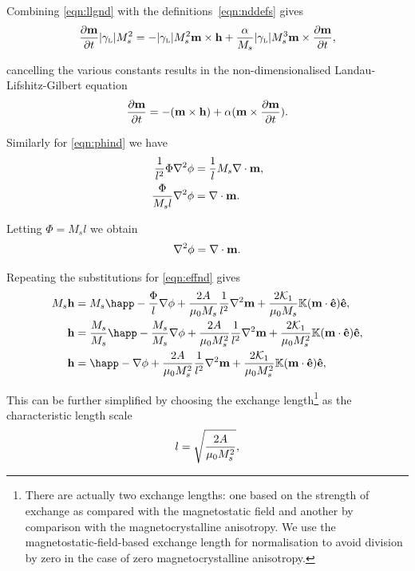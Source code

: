 Combining \cref{eqn:llgnd} with the definitions~\cref{eqn:nddefs} gives
\begin{equation}
   \frac{\partial \mathbf{m}}{\partial t} {\left|{\gamma_{\text{\tiny{L}}}} \right|} M_s^2 =
  - {\left|{\gamma_{\text{\tiny{L}}}} \right|} M_s^2 \mathbf{m} \times \mathbf{h} + \frac{\alpha}{M_s} {\left|{\gamma_{\text{\tiny{L}}}} \right|} M_s^3 \mathbf{m} \times \frac{\partial \mathbf{m}}{\partial t},
\end{equation}

cancelling the various constants results in the non-dimensionalised Landau-Lifshitz-Gilbert equation
\begin{equation}
  \label{eq:53}
  \frac{\partial \mathbf{m}}{\partial t} = - (\mathbf{m} \times \mathbf{h}) + \alpha (\mathbf{m} \times \frac{\partial \mathbf{m}}{\partial t}).
\end{equation}

Similarly for \cref{eqn:phind} we have
\begin{align*}
  \frac{1}{l^2} \Phi \nabla^{2} \phi &= \frac{1}{l} M_s \nabla \cdot \mathbf{m}, \\
  \frac{\Phi}{M_s l} \nabla^{2} \phi &= \nabla \cdot \mathbf{m}.
\end{align*}

Letting $\Phi = M_s l$ we obtain
\begin{equation}
  \label{eq:57}
  \nabla^2 \phi = \nabla \cdot \mathbf{m}.
\end{equation}

Repeating the substitutions for \cref{eqn:effnd} gives
\begin{align*}
  M_s \hv &= M_s \happ - \frac{\Phi}{l} \nabla \phi + \frac{2 \Exchc }{\mu_0 M_s} \frac{1}{l^2} \lap \mv + \frac{2\kone}{\mu_0 M_s}  \nK (\mv \cdot \ev) \ev, \\
  \hv &= \frac{M_s}{M_s} \happ - \frac{M_s}{M_s} \nabla \phi + \frac{2 \Exchc}{\mu_0 M_s^2} \frac{1}{l^2} \lap \mv + \frac{2\kone}{\mu_0 M_s^2} \nK (\mv \cdot \ev) \ev, \\
  \hv &= \happ - \nabla \phi + \frac{2 \Exchc}{\mu_0 M_s^2} \frac{1}{l^2} \lap \mv + \frac{2\kone}{\mu_0 M_s^2} \nK (\mv \cdot \ev) \ev, \\
\end{align*}

This can be further simplified by choosing the exchange length\footnote{There are actually two exchange lengths: one based on the strength of exchange as compared with the magnetostatic field and another by comparison with the magnetocrystalline anisotropy. We use the magnetostatic-field-based exchange length for normalisation to avoid division by zero in the case of zero magnetocrystalline anisotropy.} as the characteristic length scale
\begin{equation}
  \label{eqn:l-normalisation}
  l = \sqrt{ \frac{2 A}{\mu_0 M_s^2} },
\end{equation}

